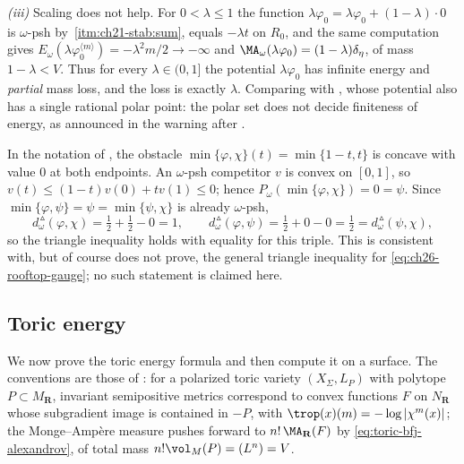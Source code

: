\begin{example}
\emph{(iii)}  Scaling does not help.  For \(0<\lambda\leq1\) the function
\(\lambda\varphi_0=\lambda\varphi_0+(1-\lambda)\cdot0\) is
\(\omega\)-psh by
\,\cref{itm:ch21-stab:sum}, equals \(-\lambda t\) on
\(R_0\), and the same computation gives
\(E_\omega(\lambda\varphi_0^{\langle m\rangle})=-\lambda^2m/2\to-\infty\) and
\(\MA_\omega(\lambda\varphi_0)=(1-\lambda)\delta_\eta\), of mass
\(1-\lambda<V\).  Thus for every \(\lambda\in(0,1]\) the potential
\(\lambda\varphi_0\) has infinite energy and \emph{partial} mass loss, and
the loss is exactly \(\lambda\).  Comparing with
, whose potential also has a single
rational polar point: the polar set does not decide finiteness of energy, as
announced in the warning after .
\end{example}

\begin{example}
\label{ex:ch26-rooftop-repair}
In the notation of , the obstacle
\(\min\{\varphi,\chi\}(t)=\min\{1-t,t\}\) is concave with value \(0\) at both
endpoints.  An \(\omega\)-psh competitor \(v\) is convex on \([0,1]\), so
\(v(t)\leq(1-t)v(0)+tv(1)\leq0\); hence
\(P_\omega(\min\{\varphi,\chi\})=0=\psi\).  Since
\(\min\{\varphi,\psi\}=\psi=\min\{\psi,\chi\}\) is already \(\omega\)-psh,
\[
 d^{\,\vartriangle}_\omega(\varphi,\chi)
 =\tfrac12+\tfrac12-0=1,
 \qquad
 d^{\,\vartriangle}_\omega(\varphi,\psi)
 =\tfrac12+0-0=\tfrac12
 =d^{\,\vartriangle}_\omega(\psi,\chi),
\]
so the triangle inequality holds with equality for this triple.  This is
consistent with, but of course does not prove, the general triangle
inequality for \eqref{eq:ch26-rooftop-gauge}; no such statement is claimed
here.
\end{example}

\subsection{Toric energy}
\label{sec:ch26-ex-toric}

We now prove the toric energy formula and then compute it on a surface.  The
conventions are those of : for a polarized toric
variety \((X_\Sigma,L_P)\) with polytope \(P\subset M_{\mathbf R}\),
invariant semipositive metrics correspond to convex functions \(F\) on
\(N_{\mathbf R}\) whose subgradient image is contained in \(-P\), with
\(\trop(x)(m)=-\log|\chi^m(x)|\); the Monge--Amp\`ere measure pushes forward
to \(n!\,\MA_{\mathbf R}(F)\) by \eqref{eq:toric-bfj-alexandrov}, of total
mass \(n!\vol_M(P)=(L^n)=V\).

